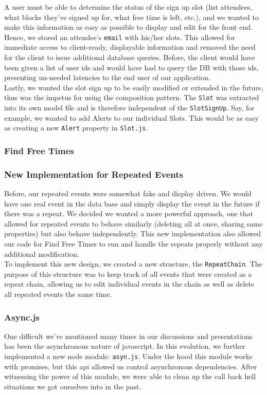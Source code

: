 \documentclass[11pt]{article}   %
\begin{document}
\noindent A user must be able to determine the status of the sign up slot (list attendees, what blocks they've signed up for, what free time is left, etc.), and we wanted to make this information as easy as possible to display and edit for the front end. Hence, we stored an attendee's \texttt{email} with his/her slots. This allowed for immediate access to client-ready, displayable information and removed the need for the client to issue additional database queries. Before, the client would have been given a list of user ids and would have had to query the DB with those ids, presenting un-needed latencies to the end user of our application.\\

\noindent Lastly, we wanted the slot sign up to be easily modified or extended in the future, thus was the impetus for using the composition pattern. The \texttt{Slot} was extracted into its own model file and is therefore independent of the \texttt{SlotSignUp}. Say, for example, we wanted to add Alerts to our individual Slots. This would be as easy as creating a new \texttt{Alert} property in \texttt{Slot.js}.

\subsubsection{Find Free Times}

\subsubsection{New Implementation for Repeated Events}
Before, our repeated events were somewhat fake and display driven. We would have one real event in the data base and simply display the event in the future if there was a repeat. We decided we wanted a more powerful approach, one that allowed for repeated events to behave similarly (deleting all at once, sharing same properties) but also behave independently. This new implementation also allowed our code for Find Free Times to run and handle the repeats properly without any additional modification.\\

\noindent To implement this new design, we created a new structure, the \texttt{RepeatChain}. The purpose of this structure was to keep track of all events that were created as a repeat chain, allowing us to edit individual events in the chain as well as delete all repeated events the same time.

\subsubsection{Async.js}
One difficult we've mentioned many times in our discussions and presentations has been the asynchronous nature of javascript. In this evolution, we further implemented a new node module: \texttt{asyn.js}. Under the hood this module works with promises, but this api allowed us control asynchronous dependencies. After witnessing the power of this module, we were able to clean up the call back hell situations we got ourselves into in the past.
\end{document}
